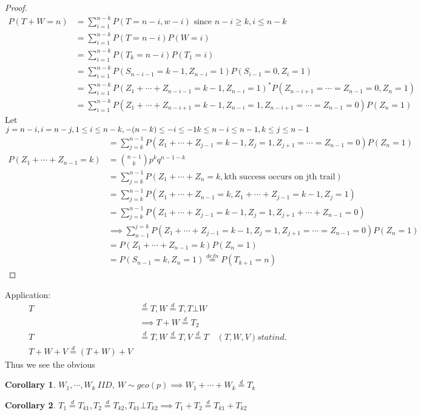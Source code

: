 \documentclass{article}
\theoremstyle{definition}
\theoremstyle{thrm}
\theoremstyle{lma}
\theoremstyle{ppst}
\theoremstyle{crlr}
\newtheorem{crlr}{Corollary}[section]
\begin{document}
\begin{proof}
	\begin{align*}
		P(T+W=n)&=\sum_{i=1}^{n-k}P(T=n-i,w-i) \text{ since } n-i\geq k, i\leq n-k\\
		&=\sum_{i=1}^{n-k} P(T=n-i)P(W=i)\\
		&=\sum_{i=1}^{n-k} P(T_k = n-i)P(T_1=i)\\
		&=\sum_{i=1}^{n-k} P(S_{n-i-1} = k-1, Z_{n-i}=1)P(S_{i-1}=0, Z_i=1)\\
		&=\sum_{i=1}^{n-k} P(Z_1+\cdots+Z_{n-i-1} = k-1, Z_{n-i}=1)^*P(Z_{n-i+1} = \cdots  = Z_{n-1}=0, Z_n=1)\\
		&=\sum_{i=1}^{n-k}P(Z_1+\cdots+Z_{n-i+1}=k-1, Z_{n-i}=1,Z_{n-i+1} = \cdots = Z_{n-1}=0) P(Z_n=1)
	\end{align*}
	Let $j=n-i, i=n-j, \\ 1\leq i\leq n-k, -(n-k)\leq -i \leq-1\\ k \leq n-i \leq n-1, k\leq j \leq n-1$
	\begin{align*}
		&=\sum_{j=k}^{n-1}P(Z_1+\cdots+Z_{j-1} = k-1, Z_j=1, Z_{j+1}=\cdots=Z_{n-1}=0)P(Z_n=1)\\
		P(Z_1+\cdots+Z_{n-1}=k)
		&={n-1 \choose k}p^kq^{n-1-k}\\
		&=\sum_{j=k}^{n-1}P(Z_1+\cdots+Z_n=k, \text{kth success occurs on jth trail})\\
		&=\sum_{j=k}^{n-1}P(Z_1+\cdots+Z_{n-1}=k, Z_1+\cdots+Z_{j-1}=k-1, Z_j=1)\\		
		&=\sum_{j=k}^{n-1}P(Z_1+\cdots+Z_{j-1}=k-1, Z_j=1, Z_{j+1}+ \cdots +Z_{n-1}=0)\\
		&\implies \sum_{n-1}^{j=k}P(Z_1+\cdots+Z_{j-1} = k-1, Z_j=1, Z_{j+1}=\cdots=Z_{n-1}=0)P(Z_n=1)\\ 
		&=P(Z_1+\cdots+Z_{n-1}=k) P(Z_n=1)\\
		&=P(S_{n-1}=k, Z_n=1) \stackrel{defn}{=}P(T_{k+1}=n)	
	\end{align*}
\end{proof}
Application:
\begin{align*}
	T&\stackrel{d}{=} T, W\stackrel{d}{=}T, T\bot W\\
	&\implies T+W\stackrel{d}{=}T_2\\
	T&\stackrel{d}{=} T, W\stackrel{d}{=}T, V\stackrel{d}{=}T \quad (T,W,V) stat ind.\\
	T+W+V\stackrel{d}{=}(T+W)+V
\end{align*}
Thus we see the obvious
\begin{crlr}
	$W_1, \cdots, W_k \ IID, \ W \sim geo(p)\implies W_1+\cdots+W_k \stackrel {d}{=}T_k$
\end{crlr}
\begin{crlr}
	$T_1\stackrel{d}{=}T_{k1}, T_2\stackrel{d}{=}T_{k2}, T_{k1}\bot T_{k2} \implies T_1+T_2\stackrel{d}{=}T_{k1}+T_{k2}$
\end{crlr}
\end{document}
